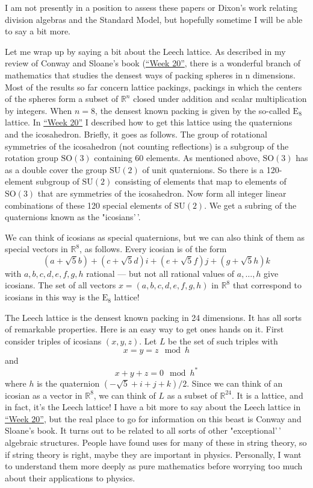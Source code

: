 \documentclass{article}
\begin{document}
I am not presently in a position to assess these papers or Dixon's work
relating division algebras and the Standard Model, but hopefully
sometime I will be able to say a bit more.

Let me wrap up by saying a bit about the Leech lattice. As described in
my review of Conway and Sloane's book (\protect\hyperlink{week20}{``Week
20''}, there is a wonderful branch of mathematics that studies the
densest ways of packing spheres in n dimensions. Most of the results so
far concern lattice packings, packings in which the centers of the
spheres form a subset of \(\mathbb{R}^n\) closed under addition and
scalar multiplication by integers. When \(n = 8\), the densest known
packing is given by the so-called \(\mathrm{E}_8\) lattice. In
\protect\hyperlink{week20}{``Week 20''} I described how to get this
lattice using the quaternions and the icosahedron. Briefly, it goes as
follows. The group of rotational symmetries of the icosahedron (not
counting reflections) is a subgroup of the rotation group
\(\mathrm{SO}(3)\) containing 60 elements. As mentioned above,
\(\mathrm{SO}(3)\) has as a double cover the group \(\mathrm{SU}(2)\) of
unit quaternions. So there is a 120-element subgroup of
\(\mathrm{SU}(2)\) consisting of elements that map to elements of
\(\mathrm{SO}(3)\) that are symmetries of the icosahedron. Now form all
integer linear combinations of these 120 special elements of
\(\mathrm{SU}(2)\). We get a subring of the quaternions known as the
"icosians'\,'.

We can think of icosians as special quaternions, but we can also think
of them as special vectors in \(\mathbb{R}^8\), as follows. Every
icosian is of the form
\[(a + \sqrt{5} b) + (c + \sqrt{5} d)i + (e + \sqrt{5} f)j + (g + \sqrt{5} h)k\]
with \(a,b,c,d,e,f,g,h\) rational --- but not all rational values of
\(a,\ldots,h\) give icosians. The set of all vectors
\(x = (a,b,c,d,e,f,g,h)\) in \(\mathbb{R}^8\) that correspond to
icosians in this way is the \(\mathrm{E}_8\) lattice!

The Leech lattice is the densest known packing in 24 dimensions. It has
all sorts of remarkable properties. Here is an easy way to get ones
hands on it. First consider triples of icosians \((x,y,z)\). Let \(L\)
be the set of such triples with \[x = y = z \mod h\] and
\[x + y + z = 0 \mod h^*\] where \(h\) is the quaternion
\((-\sqrt{5} + i + j + k)/2\). Since we can think of an icosian as a
vector in \(\mathbb{R}^8\), we can think of \(L\) as a subset of
\(\mathbb{R}^{24}\). It is a lattice, and in fact, it's the Leech
lattice! I have a bit more to say about the Leech lattice in
\protect\hyperlink{week20}{``Week 20''}, but the real place to go for
information on this beast is Conway and Sloane's book. It turns out to
be related to all sorts of other "exceptional'\,' algebraic structures.
People have found uses for many of these in string theory, so if string
theory is right, maybe they are important in physics. Personally, I want
to understand them more deeply as pure mathematics before worrying too
much about their applications to physics.
\end{document}

